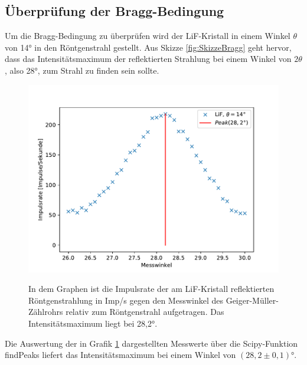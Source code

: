 \documentclass[titlepage = firstcover]{scrartcl}
\begin{document}
        \FloatBarrier
        
        \subsection{Überprüfung der Bragg-Bedingung}
            Um die Bragg-Bedingung zu überprüfen wird der LiF-Kristall in einem Winkel $\theta$ von 14° in den Röntgenstrahl gestellt. Aus Skizze \ref{fig:SkizzeBragg} geht hervor, dass das 
            Intensitätsmaximum der reflektierten Strahlung bei einem Winkel von $2\theta$, also 28°, zum Strahl zu finden sein sollte.
            \FloatBarrier
            \begin{figure}[h]
              \centering
              \caption{In dem Graphen ist die Impulsrate der am LiF-Kristall reflektierten Röntgenstrahlung in Imp/s gegen den Messwinkel des Geiger-Müller-Zählrohrs relativ zum Röntgenstrahl aufgetragen. Das Intensitätsmaximum liegt bei 28,2°.}
              \includegraphics{Bragg.pdf}
              \label{fig:bragggraph}
            \end{figure}
            \FloatBarrier  

            \noindent
            Die Auswertung der in Grafik \ref{fig:bragggraph} dargestellten Messwerte über die Scipy-Funktion findPeaks liefert das Intensitätsmaximum bei einem Winkel von $(28,2 \pm 0,1)°$. 
\end{document}
